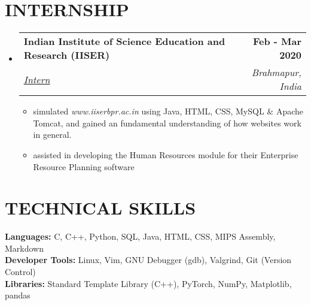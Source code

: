 \documentclass[letterpaper,11pt]{article}
\makeatletter
\newcommand{\resumeItem}[1]{
  \item\small{
    {#1 \vspace{-2pt}}
  }
}
\newcommand{\resumeSubheading}[4]{
  \vspace{-2pt}\item
    \begin{tabular*}{1.0\textwidth}[t]{l@{\extracolsep{\fill}}r}
      \textbf{\large#1} & \textbf{\small #2} \\
      \textit{\large#3} & \textit{\small #4} \\
      
    \end{tabular*}\vspace{-7pt}
}
\newcommand{\resumeSubHeadingListStart}{\begin{itemize}[leftmargin=0.0in, label={}]}
\newcommand{\resumeSubHeadingListEnd}{\end{itemize}}
\newcommand{\resumeItemListStart}{\begin{itemize}}
\newcommand{\resumeItemListEnd}{\end{itemize}\vspace{-5pt}}
\makeatother
\begin{document}
\section{INTERNSHIP}
    \resumeSubHeadingListStart
      \resumeSubheading
        {Indian Institute of Science Education and Research (IISER)}{Feb - Mar 2020}
        {\href{https://drive.google.com/file/d/1MjAsp7TuGCDzTJeRRi4D6GTi0dCwG9xk/view?usp=sharing}{\underline{Intern}} {\raisebox{-0.1\height}\faExternalLink}}{Brahmapur, India}
        \resumeItemListStart
          \resumeItem{\normalsize{simulated \textit{www.iiserbpr.ac.in} using Java, HTML, CSS, MySQL \& Apache Tomcat, and gained an fundamental understanding of how websites work in general.}}
          \resumeItem{\normalsize{assisted in developing the Human Resources module for their Enterprise Resource Planning software}}
        \resumeItemListEnd
    \resumeSubHeadingListEnd
\vspace{-12pt}


\section{TECHNICAL SKILLS}
\begin{itemize}[leftmargin=0.15in, label={}]
  \small{\item{
    \textbf{\normalsize{Languages:}}{ \normalsize{C, C++, Python, SQL, Java, HTML, CSS, MIPS Assembly, Markdown}} \\
    \textbf{\normalsize{Developer Tools:}}{ \normalsize{Linux, Vim, GNU Debugger (gdb), Valgrind, Git (Version Control)}} \\
    \textbf{\normalsize{Libraries:}}{ \normalsize{Standard Template Library (C++), PyTorch, NumPy, Matplotlib, pandas}} \\
  }}
\end{itemize}
\vspace{-12pt}

 
\end{document}
